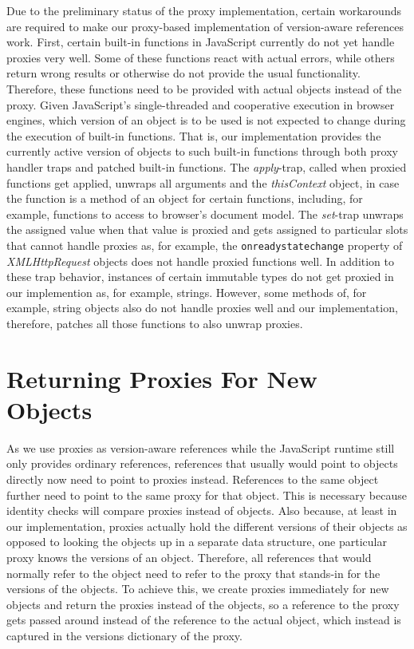 Due to the preliminary status of the proxy implementation, certain workarounds are required to make our proxy-based implementation of version-aware references work.
First, certain built-in functions in JavaScript currently do not yet handle proxies very well.
Some of these functions react with actual errors, while others return wrong results or otherwise do not provide the usual functionality.
Therefore, these functions need to be provided with actual objects instead of the proxy.
Given JavaScript's single-threaded and cooperative execution in browser engines, which version of an object is to be used is not expected to change during the execution of built-in functions.
That is, our implementation provides the currently active version of objects to such built-in functions through both proxy handler traps and patched built-in functions.
The \emph{apply}-trap, called when proxied functions get applied, unwraps all arguments and the \emph{thisContext} object, in case the function is a method of an object for certain functions, including, for example, functions to access to browser's document model.
The \emph{set}-trap unwraps the assigned value when that value is proxied and gets assigned to particular slots that cannot handle proxies as, for example, the \lstinline{onreadystatechange} property of \emph{XMLHttpRequest} objects does not handle proxied functions well.
In addition to these trap behavior, instances of certain immutable types do not get proxied in our implemention as, for example, strings.
However, some methods of, for example, string objects also do not handle proxies well and our implementation, therefore, patches all those functions to also unwrap proxies.


\section{Returning Proxies For New Objects}

As we use proxies as version-aware references while the JavaScript runtime still only provides ordinary references, references that usually would point to objects directly now need to point to proxies instead. 
References to the same object further need to point to the same proxy for that object.
This is necessary because identity checks will compare proxies instead of objects.
Also because, at least in our implementation, proxies actually hold the different versions of their objects as opposed to looking the objects up in a separate data structure, one particular proxy knows the versions of an object.
Therefore, all references that would normally refer to the object need to refer to the proxy that stands-in for the versions of the objects.
To achieve this, we create proxies immediately for new objects and return the proxies instead of the objects, so a reference to the proxy gets passed around instead of the reference to the actual object, which instead is captured in the versions dictionary of the proxy.

